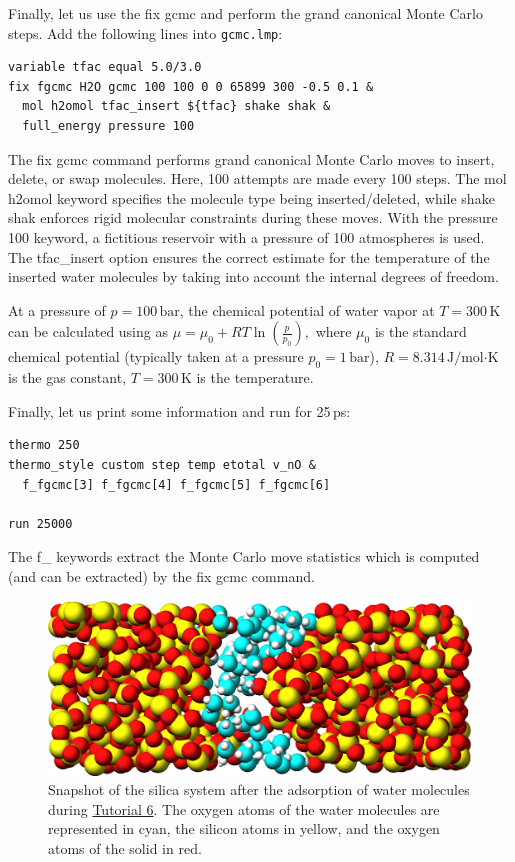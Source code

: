 \documentclass[9pt,tutorial]{livecoms}
\newcommand{\lmpcmd}[1]{\colorbox{listing}{\textcolor{command}{\small{#1}}}} %
\newcommand{\flecmd}[1]{\textcolor{command}{\texttt{#1}}} %
\begin{document}
Finally, let us use the \lmpcmd{fix gcmc} and perform the grand canonical Monte
Carlo steps.  Add the following lines into \flecmd{gcmc.lmp}:
\begin{lstlisting}
variable tfac equal 5.0/3.0
fix fgcmc H2O gcmc 100 100 0 0 65899 300 -0.5 0.1 &
  mol h2omol tfac_insert ${tfac} shake shak &
  full_energy pressure 100
\end{lstlisting}
The \lmpcmd{fix gcmc} command performs grand canonical Monte Carlo
moves to insert, delete, or swap molecules. Here, 100 attempts are made every
100 steps.  The \lmpcmd{mol h2omol} keyword specifies the
molecule type being inserted/deleted, while \lmpcmd{shake shak} enforces rigid
molecular constraints during these moves. With the \lmpcmd{pressure 100} keyword,
a fictitious reservoir with a pressure of 100 atmospheres is used.
The \lmpcmd{tfac\_insert} option ensures the correct estimate for the temperature
of the inserted water molecules by taking into account the internal degrees of
freedom.

\begin{note}
  At a pressure of $p = 100\,\text{bar}$, the chemical potential of water vapor at $T = 300\,\text{K}$
  can be calculated using as $\mu = \mu_0 + RT \ln (\frac{p}{p_0}),$ where $\mu_0$ is the standard
  chemical potential (typically taken at a pressure $p_0 = 1 \, \text{bar}$), $R = 8.314\, \text{J/mol·K}$
  is the gas constant, $T = 300\,\text{K}$ is the temperature.
\end{note}

Finally, let us print some information and run for 25\,ps:
\begin{lstlisting}
thermo 250
thermo_style custom step temp etotal v_nO &
  f_fgcmc[3] f_fgcmc[4] f_fgcmc[5] f_fgcmc[6]

run 25000
\end{lstlisting}
The \lmpcmd{f\_} keywords extract the Monte Carlo move statistics
which is computed (and can be extracted) by the \lmpcmd{fix gcmc} command.

\begin{figure}
\centering
\includegraphics[width=\linewidth]{GCMC-solvated}
\caption{Snapshot of the silica system after the adsorption of water molecules
during \hyperref[gcmc-silica-label]{Tutorial 6}.
The oxygen atoms of the water molecules are represented in cyan, the silicon
atoms in yellow, and the oxygen atoms of the solid in red.}
\label{fig:GCMC-solvated}
\end{figure}
\end{document}
